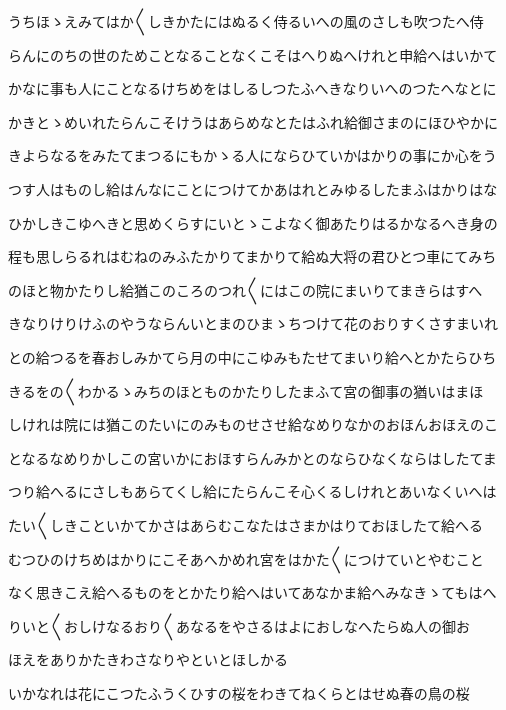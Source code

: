 \documentclass[a4paper,11pt,landscape]{ltjtarticle}
\begin{document}
\par\medskip
うちほゝえみてはか〱しきかたにはぬるく侍るいへの風のさしも吹つたへ侍
\par\medskip
らんにのちの世のためことなることなくこそはへりぬへけれと申給へはいかて
\par\medskip
かなに事も人にことなるけちめをはしるしつたふへきなりいへのつたへなとに
\par\medskip
かきとゝめいれたらんこそけうはあらめなとたはふれ給御さまのにほひやかに
\par\medskip
きよらなるをみたてまつるにもかゝる人にならひていかはかりの事にか心をう
\par\medskip
つす人はものし給はんなにことにつけてかあはれとみゆるしたまふはかりはな
\par\medskip
ひかしきこゆへきと思めくらすにいとゝこよなく御あたりはるかなるへき身の
\par\medskip
程も思しらるれはむねのみふたかりてまかりて給ぬ大将の君ひとつ車にてみち
\par\medskip
のほと物かたりし給猶このころのつれ〱にはこの院にまいりてまきらはすへ
\par\medskip
きなりけりけふのやうならんいとまのひまゝちつけて花のおりすくさすまいれ
\par\medskip
との給つるを春おしみかてら月の中にこゆみもたせてまいり給へとかたらひち
\par\medskip
きるをの〱わかるゝみちのほとものかたりしたまふて宮の御事の猶いはまほ
\par\medskip
しけれは院には猶このたいにのみものせさせ給なめりなかのおほんおほえのこ
\par\medskip
となるなめりかしこの宮いかにおほすらんみかとのならひなくならはしたてま
\par\medskip
つり給へるにさしもあらてくし給にたらんこそ心くるしけれとあいなくいへは
\par\medskip
たい〱しきこといかてかさはあらむこなたはさまかはりておほしたて給へる
\par\medskip
むつひのけちめはかりにこそあへかめれ宮をはかた〱につけていとやむこと
\par\medskip
なく思きこえ給へるものをとかたり給へはいてあなかま給へみなきゝてもはへ
\par\medskip
りいと〱おしけなるおり〱あなるをやさるはよにおしなへたらぬ人の御お
\par\medskip
ほえをありかたきわさなりやといとほしかる
\par\medskip
いかなれは花にこつたふうくひすの桜をわきてねくらとはせぬ春の鳥の桜
\par\medskip
\end{document}

